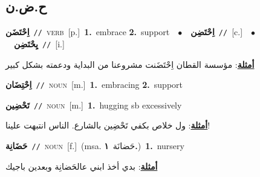 \documentclass[10pt,a4paper,twoside]{article} %
\begin{document}
\begin{multicols}{2}
\vspace{-3mm}
\subsection*{\color{blue}\foreignlanguage{arabic}{ح.ض.ن}\color{blue}{}} 

{\setlength\topsep{0pt}\textbf{\foreignlanguage{arabic}{اِحْتَضَن}}\ {\color{gray}\texttt{//}\color{black}}\ \textsc{verb}\ [p.]\ \textbf{1.}~embrace  \textbf{2.}~support\ \ $\bullet$\ \ \setlength\topsep{0pt}\textbf{\foreignlanguage{arabic}{اِحْتَضِن}}\ {\color{gray}\texttt{//}\color{black}}\ [c.]\ \ $\bullet$\ \ \setlength\topsep{0pt}\textbf{\foreignlanguage{arabic}{يِحْتَضِن}}\ {\color{gray}\texttt{//}\color{black}}\ [i.]\  \begin{flushright}\color{gray}\foreignlanguage{arabic}{\textbf{\underline{\foreignlanguage{arabic}{أمثلة}}}: مؤسسة القطان اِحْتَضَنت مشروعنا من البداية ودعمته بشكل كبير}\end{flushright}\color{black}} \vspace{2mm}

{\setlength\topsep{0pt}\textbf{\foreignlanguage{arabic}{اِحْتِضَان}}\ {\color{gray}\texttt{//}\color{black}}\ \textsc{noun}\ [m.]\ \textbf{1.}~embracing  \textbf{2.}~support\ } \vspace{2mm}

{\setlength\topsep{0pt}\textbf{\foreignlanguage{arabic}{تَحْضِين}}\ {\color{gray}\texttt{//}\color{black}}\ \textsc{noun}\ [m.]\ \textbf{1.}~hugging sb excessively\  \begin{flushright}\color{gray}\foreignlanguage{arabic}{\textbf{\underline{\foreignlanguage{arabic}{أمثلة}}}: ول خلاص بكفي تَحْضِين بالشارع. الناس انتبهت علينا!}\end{flushright}\color{black}} \vspace{2mm}

{\setlength\topsep{0pt}\textbf{\foreignlanguage{arabic}{حَضَانِة}}\ {\color{gray}\texttt{//}\color{black}}\ \textsc{noun}\ [f.]\ \color{gray}(msa. \foreignlanguage{arabic}{حَضانَة}~\foreignlanguage{arabic}{\textbf{١.}})\color{black}\ \textbf{1.}~nursery\  \begin{flushright}\color{gray}\foreignlanguage{arabic}{\textbf{\underline{\foreignlanguage{arabic}{أمثلة}}}: بدي أخذ ابني عالحَضانِة وبعدين باجيك}\end{flushright}\color{black}} \vspace{2mm}


\end{multicols}
\end{document}
